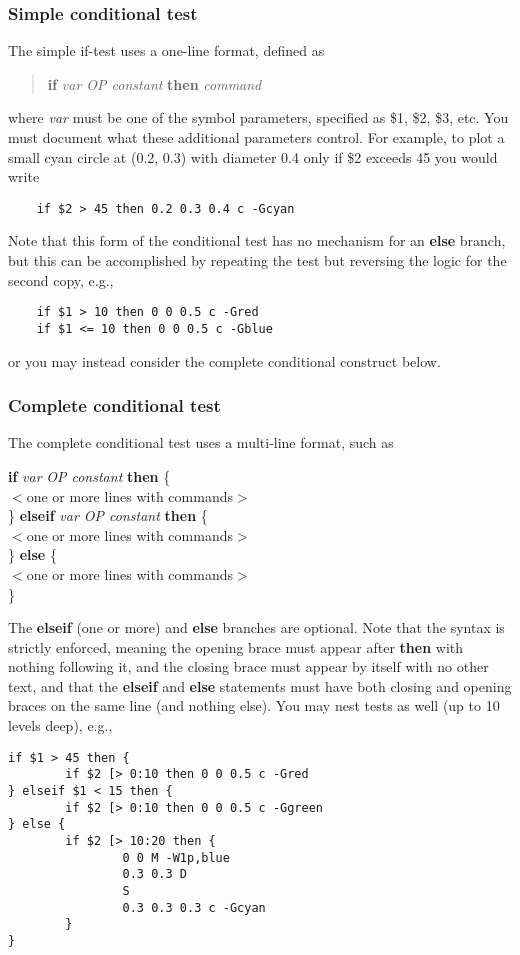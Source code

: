 \subsubsection{Simple conditional test}
The simple if-test uses a one-line format, defined as
\begin{quote}
	\textbf{if} \emph{var OP constant} \textbf{then}  \emph{command}
\end{quote}
where \emph{var} must be one of the symbol parameters, specified as \$1, \$2, \$3, etc.
You must document what these additional parameters control.  For example, to plot a
small cyan circle at (0.2, 0.3) with diameter 0.4 only if \$2 exceeds 45 you would write
\begin{verbatim}
	if $2 > 45 then 0.2 0.3 0.4 c -Gcyan
\end{verbatim}
Note that this form of the conditional test has no mechanism for an \textbf{else} branch, but this can be accomplished
by repeating the test but reversing the logic for the second copy, e.g.,
\begin{verbatim}
	if $1 > 10 then 0 0 0.5 c -Gred
	if $1 <= 10 then 0 0 0.5 c -Gblue
\end{verbatim}
or you may instead consider the complete conditional construct below.
\subsubsection{Complete conditional test}

The complete conditional test uses a multi-line format, such as
\begin{tabbing}
	\textbf{if} \emph{var} \= \emph{OP constant} \textbf{then}  \{ \\
	\> $<$one or more lines with commands$>$ \\
	\} \textbf{elseif} \emph{var OP constant} \textbf{then}  \{ \\
	\> $<$one or more lines with commands$>$ \\
	\} \textbf{else} \{ \\
	\> $<$one or more lines with commands$>$ \\
	\}
\end{tabbing}
The \textbf{elseif} (one or more) and \textbf{else} branches are optional.  Note that the syntax is strictly enforced,
meaning the opening brace must appear after \textbf{then} with nothing following it, and the closing brace
must appear by itself with no other text, and that the \textbf{elseif} and \textbf{else} statements must have both closing
and opening braces on the same line (and nothing else).  You may nest tests as well (up to 10 levels deep), e.g.,
\begin{verbatim}
if $1 > 45 then {
        if $2 [> 0:10 then 0 0 0.5 c -Gred
} elseif $1 < 15 then {
        if $2 [> 0:10 then 0 0 0.5 c -Ggreen
} else {
        if $2 [> 10:20 then {
                0 0 M -W1p,blue
                0.3 0.3 D
                S
                0.3 0.3 0.3 c -Gcyan
        }
}
\end{verbatim}

